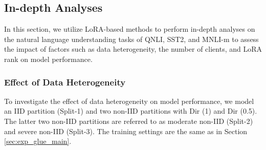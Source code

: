 \documentclass{article} %
\begin{document}
\begin{table}[h]
\caption{Time and space costs for each method on the RTE and QNLI tasks. \# Communication round denotes the number of communication rounds to reach the predefined target performance.}
\label{tab:efficiency_compare}
\vspace{-0.3cm}
\begin{center}
\end{center}
\end{table}



\subsection{In-depth Analyses}

In this section, we utilize LoRA-based methods to perform in-depth analyses on the natural language understanding tasks of QNLI, SST2, and MNLI-m to assess the impact of factors such as data heterogeneity, the number of clients, and LoRA rank on model performance.

\subsubsection{Effect of Data Heterogeneity}
To investigate the effect of data heterogeneity on model performance, we model an IID partition (Split-1) and two non-IID partitions with Dir (1) and Dir (0.5). The latter two non-IID partitions are referred to as moderate non-IID (Split-2) and severe non-IID (Split-3). The training settings are the same as in Section \ref{sec:exp_glue_main}.
\end{document}
